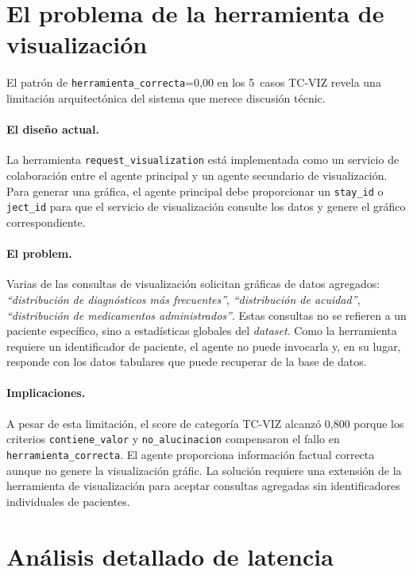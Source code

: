 \section{El problema de la herramienta de visualización}

El patrón de \texttt{herramienta\_correcta}=0,00 en los 5~casos TC-VIZ revela una limitación arquitectónica del sistema que merece discusión técnic.

\paragraph{El diseño actual.} La herramienta \texttt{request\_visualization} está implementada como un servicio de colaboración entre el agente principal y un agente secundario de visualización. Para generar una gráfica, el agente principal debe proporcionar un \texttt{stay\_id} o \texttt{ject\_id} para que el servicio de visualización consulte los datos y genere el gráfico correspondiente.

\paragraph{El problem.} Varias de las consultas de visualización solicitan gráficas de datos agregados: \textit{``distribución de diagnósticos más frecuentes''}, \textit{``distribución de acuidad''}, \textit{``distribución de medicamentos administrados''}. Estas consultas no se refieren a un paciente específico, sino a estadísticas globales del \textit{dataset}. Como la herramienta requiere un identificador de paciente, el agente no puede invocarla y, en su lugar, responde con los datos tabulares que puede recuperar de la base de datos.

\paragraph{Implicaciones.} A pesar de esta limitación, el score de categoría TC-VIZ alcanzó 0,800 porque los criterios \texttt{contiene\_valor} y \texttt{no\_alucinacion} compensaron el fallo en \texttt{herramienta\_correcta}. El agente proporciona información factual correcta aunque no genere la visualización gráfic. La solución requiere una extensión de la herramienta de visualización para aceptar consultas agregadas sin identificadores individuales de pacientes.


\section{Análisis detallado de latencia}

